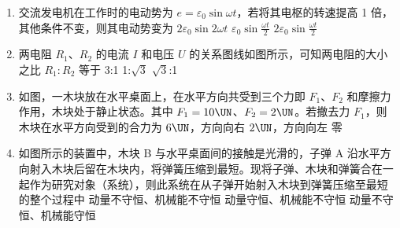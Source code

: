 \documentclass[\gkver]{gaokaozhenti}
\begin{document}
\begin{enumerate}
\item
交流发电机在工作时的电动势为 $e=\varepsilon_{0}\sin\omega t$，若将其电枢的转速提高 1 倍，其他条件不变，则其电动势变为
{$2\varepsilon_{0}\sin2\omega t$}
{$\varepsilon_{0}\sin\frac{\omega t}{2}$}
{$2\varepsilon_{0}\sin\frac{\omega t}{2}$}


\item
两电阻 $R_{1}$、$R_{2}$ 的电流 $I$ 和电压 $U$ 的关系图线如图所示，可知两电阻的大小之比 $R_{1}:R_{2}$ 等于
{3:1}
{1:$\sqrt{3}$}
{$\sqrt{3}$:1}


\item
如图，一木块放在水平桌面上，在水平方向共受到三个力即 $F_{1}$、$F_{2}$ 和摩擦力作用，木块处于静止状态。其中 $F_{1}=10\UN$、$F_{2}=2\UN$。若撤去力 $F_{1}$，则木块在水平方向受到的合力为
\onepicture[w=3.94cm]{}
{$6\UN$，方向向右}
{$2\UN$，方向向左}
{零}


\item
如图所示的装置中，木块 B 与水平桌面间的接触是光滑的，子弹 A 沿水平方向射入木块后留在木块内，将弹簧压缩到最短。现将子弹、木块和弹簧合在一起作为研究对象（系统），则此系统在从子弹开始射入木块到弹簧压缩至最短的整个过程中
\onepicture[w=6.00cm]{}
{动量不守恒、机械能不守恒}
{动量守恒、机械能不守恒}
{动量不守恒、机械能守恒}


\end{enumerate}
\end{document}
